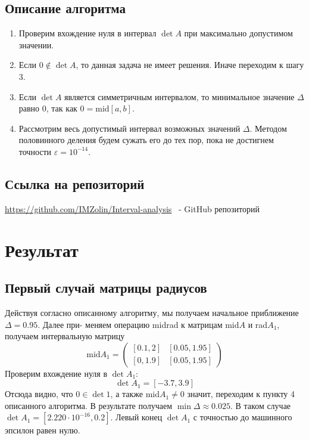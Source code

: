 \documentclass[a4paper,14pt]{article}
\begin{document}
	\subsection{Описание алгоритма}
	\begin{enumerate}
		\item Проверим вхождение нуля в интервал $\det A$ при максимально допустимом значении.
		\item Если $0 \notin \det A$, то данная задача не имеет решения. Иначе переходим к шагу 3.
		\item Если $\det A$ является симметричным интервалом, то минимальное значение $\Delta$ равно 0, так как
		$0 = $mid$[a, b]$.
		\item Рассмотрим весь допустимый интервал возможных значений $\Delta$. Методом половинного деления
		будем сужать его до тех пор, пока не достигнем точности $\varepsilon = 10^{-14}$.
	\end{enumerate}
	\subsection{Ссылка на репозиторий}
	\url{https://github.com/IMZolin/Interval-analysis} \ - GitHub репозиторий
	
	\section{Результат}
	\subsection{Первый случай матрицы радиусов}
	Действуя согласно описанному алгоритму, мы получаем начальное приближение $\Delta = 0.95$. Далее при-
	меняем операцию midrad к матрицам mid$A$ и rad$A_1$, получаем интервальную матрицу
	\begin{equation}
		\text{mid} A_1 = \begin{pmatrix}
			[0.1,2] & [0.05,1.95]\\ 
			[0,1.9] & [0.05,1.95]
		\end{pmatrix}
	\end{equation}
	Проверим вхождение нуля в $\det A_1$:
	\begin{equation}
		\det A_1 = [-3.7,3.9]
	\end{equation}
	Отсюда видно, что $0 \in \det 1$, а также mid$A_1 \neq 0$ значит, переходим к пункту 4 описанного алгоритма.
	В результате получаем $\min \Delta \approx 0.025$. В таком случае $\det A_1 = [2.220 · 10^{-16}, 0.2]$. Левый конец $\det A_1$
	с точностью до машинного эпсилон равен нулю.
\end{document}
